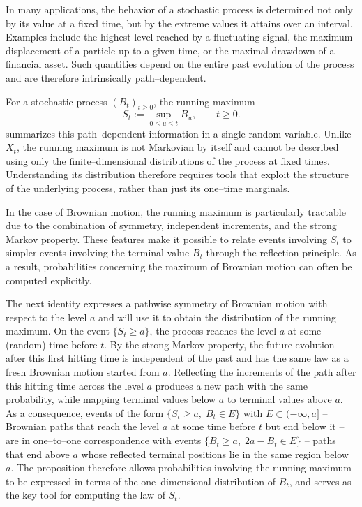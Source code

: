 In many applications, the behavior of a stochastic process is determined not only by its
value at a fixed time, but by the extreme values it attains over an interval. Examples
include the highest level reached by a fluctuating signal, the maximum displacement of a
particle up to a given time, or the maximal drawdown of a financial asset. Such quantities
depend on the entire past evolution of the process and are therefore intrinsically
path--dependent.

For a stochastic process $(B_t)_{t \ge 0}$, the running maximum
\[
S_t:=\sup_{0\le u\le t} B_u,\qquad t\ge0.
\]
summarizes this path--dependent information in a single random variable. Unlike $X_t$,
the running maximum is not Markovian by itself and cannot be described using only the
finite--dimensional distributions of the process at fixed times. Understanding its
distribution therefore requires tools that exploit the structure of the underlying
process, rather than just its one--time marginals.

In the case of Brownian motion, the running maximum is particularly tractable due to the
combination of symmetry, independent increments, and the strong Markov property. These
features make it possible to relate events involving $S_t$ to simpler events involving
the terminal value $B_t$ through the reflection principle. As a result, probabilities
concerning the maximum of Brownian motion can often be computed explicitly.

The next identity expresses a pathwise symmetry of Brownian motion with respect to the level
$a$ and will use it to obtain the distribution of the running maximum. On the event $\{S_t \ge a\}$, the process reaches the level $a$ at some (random) time
before $t$. By the strong Markov property, the future evolution after this first hitting
time is independent of the past and has the same law as a fresh Brownian motion started
from $a$. Reflecting the increments of the path after this hitting time across the level
$a$ produces a new path with the same probability, while mapping terminal values below $a$
to terminal values above $a$. As a consequence, events of the form $\{S_t \ge a,\; B_t \in
E\}$ with $E \subset (-\infty,a]$ -- Brownian paths that reach the
level $a$ at some time before $t$ but end below it -- are in one--to--one correspondence with events
$\{B_t \ge a,\; 2a-B_t \in E\}$ -- paths that end above $a$ whose reflected terminal
positions lie in the same region below $a$. The proposition therefore allows probabilities involving
the running maximum to be expressed in terms of the one--dimensional distribution of
$B_t$, and serves as the key tool for computing the law of $S_t$.

